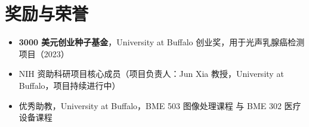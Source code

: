 \documentclass[letterpaper,10pt]{article}
\begin{document}
\vspace{-2pt}

\section{奖励与荣誉}
\begin{itemize}[leftmargin=0.2in, itemsep=1pt]
  \item \small \textbf{3000 美元创业种子基金}，University at Buffalo 创业奖，用于光声乳腺癌检测项目（2023）
  \item \small NIH 资助科研项目核心成员（项目负责人：Jun Xia 教授，University at Buffalo，项目持续进行中）
  \item \small 优秀助教，University at Buffalo，BME 503 图像处理课程 与 BME 302 医疗设备课程
\end{itemize}
\end{document}
